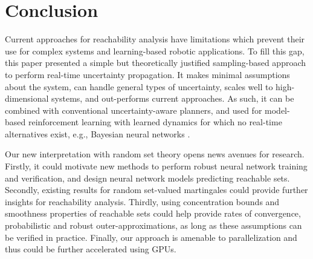 \documentclass{article}
\begin{document}


\vspace{-2mm}
\section{Conclusion}\label{sec:conclusion}
\vspace{-2.3mm}

Current approaches for reachability analysis have limitations which prevent their use for complex systems and learning-based robotic applications. To fill this gap, this paper presented a simple but theoretically justified sampling-based approach to perform real-time uncertainty propagation. It makes minimal assumptions about the system, can handle general types of uncertainty, scales well to high-dimensional systems, and 
out-performs current approaches.  
As such, it can be combined with conventional uncertainty-aware planners, and used for model-based reinforcement learning with learned dynamics for which no real-time alternatives exist, e.g., Bayesian neural networks \citep{LewSharmaHarrisonPavone2020}.

\vspace{-0.3mm}

Our new interpretation with random set theory opens news avenues for research. Firstly, it could motivate new methods to perform robust neural network training and verification, and design neural network models predicting reachable sets. Secondly, existing results for random set-valued martingales could provide further insights for reachability analysis.  Thirdly, using concentration bounds and smoothness properties of reachable sets could help provide rates of convergence, probabilistic and robust outer-approximations, as long as these assumptions can be verified in practice. Finally, our approach is amenable to parallelization and thus could be further accelerated using GPUs. 
\end{document}
